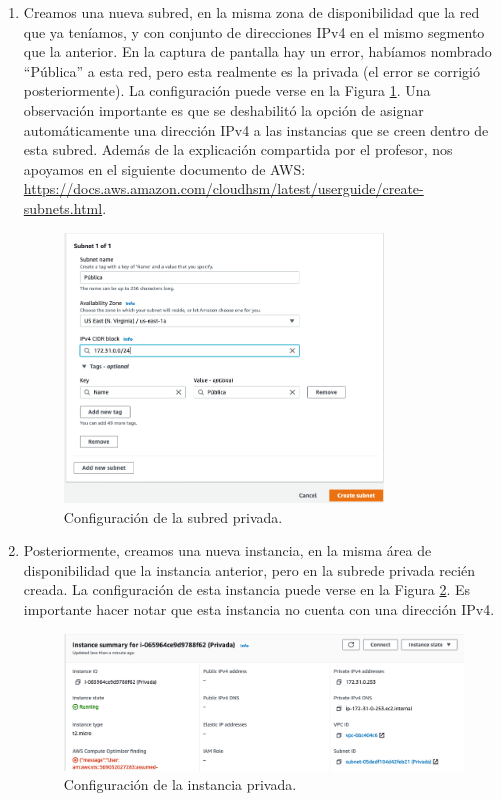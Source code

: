 \documentclass{article}
\begin{document}
\begin{enumerate}
  \item Creamos una nueva subred, en la misma zona de
    disponibilidad que la red que ya ten\'iamos, y con
    conjunto de direcciones IPv4 en el mismo segmento
    que la anterior.   En la captura de pantalla hay un
    error, hab\'iamos nombrado ``P\'ublica'' a esta red,
    pero esta realmente es la privada (el error se
    corrigi\'o posteriormente).    La configuraci\'on
    puede verse en la Figura \ref{fig:NAT-priSubnet}. Una
    observaci\'on importante es que se deshabilit\'o
    la opci\'on de asignar autom\'aticamente una
    direcci\'on IPv4 a las instancias que se creen
    dentro de esta subred.   Adem\'as de la explicaci\'on
    compartida por el profesor, nos apoyamos en el
    siguiente documento de AWS: \href{https://docs.aws.amazon.com/cloudhsm/latest/userguide/create-subnets.html}{https://docs.aws.amazon.com/cloudhsm/latest/userguide/create-subnets.html}.
    \begin{figure}[H]
      \centering
      \includegraphics[width=0.8\textwidth]{SSNAT/privateSubnet}
      \caption{Configuraci\'on de la subred privada.}
      \label{fig:NAT-priSubnet}
    \end{figure}

  \item Posteriormente, creamos una nueva instancia,
    en la misma \'area de disponibilidad que la instancia
    anterior, pero en la subrede privada reci\'en creada.
    La configuraci\'on de esta instancia puede verse en
    la Figura \ref{fig:NAT-priInstance}.   Es importante hacer
    notar que esta instancia no cuenta con una direcci\'on
    IPv4.
    \begin{figure}[H]
      \centering
      \includegraphics[width=\textwidth]{SSNAT/privateInstance}
      \caption{Configuraci\'on de la instancia privada.}
      \label{fig:NAT-priInstance}
    \end{figure}


\end{enumerate}
\end{document}
